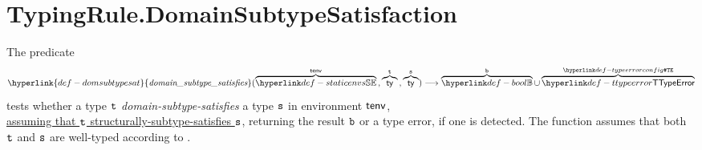 \documentclass{book}
\newcommand\domsubtypesat[0]{\hyperlink{def-domsubtypesat}{\textfunc{domain\_subtype\_satisfies}}}
\begin{document}
\section{TypingRule.DomainSubtypeSatisfaction\label{sec:TypingRule.DomainSubtypeSatisfaction}}
\hypertarget{def-domsubtypesat}{}
The predicate
\[
  \domsubtypesat(\overname{\staticenvs}{\tenv} \aslsep \overname{\ty}{\vt} \aslsep \overname{\ty}{\vs})
  \aslto \overname{\Bool}{\vb} \cup \overname{\TTypeError}{\TypeErrorConfig}
\]
tests whether a type $\texttt{t}$ \emph{domain-subtype-satisfies} a type $\texttt{s}$ in environment $\textsf{tenv}$,\\
\underline{assuming that $\texttt{t}$ structurally-subtype-satisfies $\texttt{s}$},
returning the result $\texttt{b}$ or a type error, if one is detected.
The function assumes that both $\texttt{t}$ and $\texttt{s}$ are well-typed according to .
\end{document}
